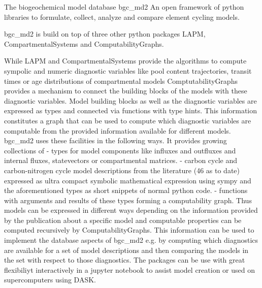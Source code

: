The biogeochemical model database bgc_md2
An open framework of python libraries to formulate, collect, analyze and compare element cycling models.

bgc_md2 is build on top of three other python packages LAPM, CompartmentalSystems and ComputabilityGraphs.

While LAPM and CompartmentalSystems provide the algorithms to compute sympolic and numeric diagnostic variables like pool content trajectories, transit times or age distributions of compartmental models ComptutabilityGraphs provides a mechanism to connect the building blocks of the models with these diagnostic variables. 
Model building blocks as well as the diagnostic variables are expressed as types and connected via functions with type hints. This information constitutes a graph that can be used to compute which diagnostic variables are computable from the provided information available for different models.
bgc_md2 uses these facilities in the following ways.
It provides growing collections of 
- types for model components like influxes and outfluxes and internal fluxes, statevectors or  compartmental matrices.
- carbon cycle and carbon-nitrogen cycle model descriptions from the literature (46 as to date) expressed as ultra compact symbolic mathematical expression using sympy and the aforementioned types as short snippets of normal python code. 
- functions with arguments and results of these types forming a computability graph.
Thus models can be expressed in different ways depending on the information provided by the publication about a specific model and computable properties can be computed recursively by ComputabilityGraphs.
This information can be used to implement the database aspects of bgc_md2 e.g. by computing which diagnostics are available for a set of model descriptions and then comparing the models in the set with respect to those diagnostics. 
The packages can be use with great flexibiliyt interactively in a jupyter notebook to assist model creation or used on supercomputers using DASK.
